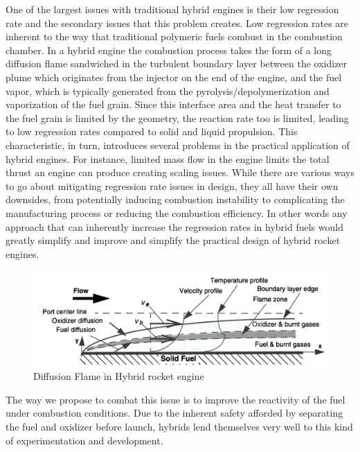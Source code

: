 \documentclass[letterpaper, 10 pt]{ieeeconf}
\begin{document}
One of the largest issues with traditional hybrid engines is their low regression rate and the secondary issues that this problem creates. Low regression rates are inherent to the way that traditional polymeric fuels combust in the combustion chamber. In a hybrid engine the combustion process takes the form of a long diffusion flame sandwiched in the turbulent boundary layer between the oxidizer plume which originates from the injector on the end of the engine, and the fuel vapor, which is typically generated from the pyrolysis/depolymerization and vaporization of the fuel grain\cite{HumbleHybrid}. Since this interface area and the heat transfer to the fuel grain is limited by the geometry, the reaction rate too is limited, leading to low regression rates compared to solid and liquid propulsion. This characteristic, in turn, introduces several problems in the practical application of hybrid engines. For instance, limited mass flow in the engine limits the total thrust an engine can produce creating scaling issues. While there are various ways to go about mitigating regression rate issues in design, they all have their own downsides, from potentially inducing combustion instability to complicating the manufacturing process or reducing the combustion efficiency. In other words any approach that can inherently increase the regression rates in hybrid fuels would greatly simplify and improve and simplify the practical design of hybrid rocket engines.

\begin{figure}
    \centering
    \includegraphics[width=1\linewidth]{Figures/diffusionFlame.png}
    \caption{Diffusion Flame in Hybrid rocket engine\cite{HumbleHybrid}}
    \label{fig:placeholder}
\end{figure}

The way we propose to combat this issue is to improve the reactivity of the fuel under combustion conditions. Due to the inherent safety afforded by separating the fuel and oxidizer before launch, hybrids lend themselves very well to this kind of experimentation and development. 
\end{document}
